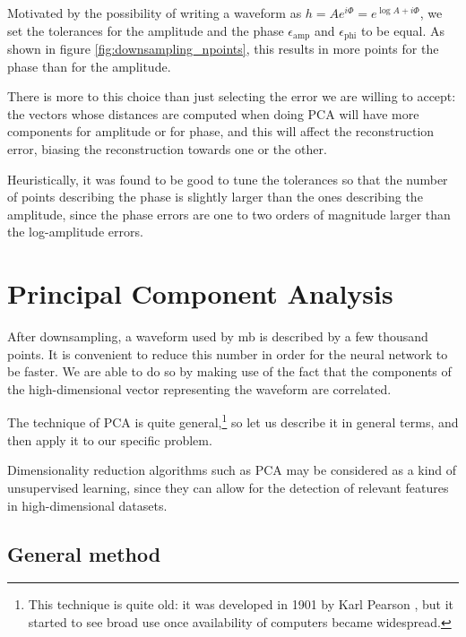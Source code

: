 \documentclass[main.tex]{subfiles}
\begin{document}
Motivated by the possibility of writing a waveform as \(h = A e^{i \Phi } = e^{\log A + i \Phi }\), we set the tolerances for the amplitude and the phase \(\epsilon _{\text{amp}}\) and \(\epsilon _{\text{phi}}\) to be equal.
As shown in figure \ref{fig:downsampling_npoints}, this results in more points for the phase than for the amplitude. 

There is more to this choice than just selecting the error we are willing to accept:
the vectors whose distances are computed when doing \ac{PCA} will have more components for amplitude or for phase, and this will affect the reconstruction error, biasing the reconstruction towards one or the other. 

Heuristically, it was found to be good to tune the tolerances so that the number of points describing the phase is slightly larger than the ones describing the amplitude, since the phase errors are one to two orders of magnitude larger than the log-amplitude errors. 

\section{Principal Component Analysis} \label{sec:principal-component-analysis}

After downsampling, a waveform used by \acs{mb} is described by a few thousand points.
It is convenient to reduce this number in order for the neural network to be faster.
We are able to do so by making use of the fact that the components of the high-dimensional vector representing the waveform are correlated.

The technique of \ac{PCA} is quite general,\footnote{This technique is quite old: it was developed in 1901 by Karl Pearson \cite[]{pearsonLIIILinesPlanes1901,manlyMultivariateStatisticalMethods2017}, but it started to see broad use once availability of computers became widespread.} so let us describe it in general terms, and then apply it to our specific problem.

Dimensionality reduction algorithms such as \ac{PCA} may be considered as a kind of unsupervised learning, since they can allow for the detection of relevant features in high-dimensional datasets.

\subsection{General method}
\end{document}
